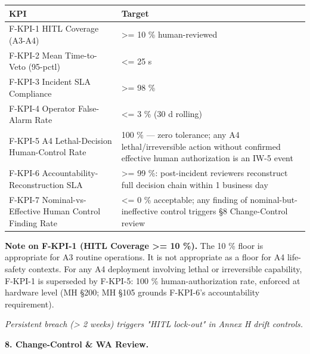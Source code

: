 \documentclass[11pt]{article}
\begin{document}
{\footnotesize
\begin{longtable}{|p{8.0cm}|p{8.0cm}|}\hline
\textbf{KPI} & \textbf{Target} \\ \hline\endhead
F-KPI-1 HITL Coverage (A3-A4) & >= 10 \% human-reviewed \\ \hline
F-KPI-2 Mean Time-to-Veto (95-pctl) & <= 25 s \\ \hline
F-KPI-3 Incident SLA Compliance & >= 98 \% \\ \hline
F-KPI-4 Operator False-Alarm Rate & <= 3 \% (30 d rolling) \\ \hline
F-KPI-5 A4 Lethal-Decision Human-Control Rate & 100 \% — zero tolerance; any A4 lethal/irreversible action without confirmed effective human authorization is an IW-5 event \\ \hline
F-KPI-6 Accountability-Reconstruction SLA & >= 99 \%: post-incident reviewers reconstruct full decision chain within 1 business day \\ \hline
F-KPI-7 Nominal-vs-Effective Human Control Finding Rate & <= 0 \% acceptable; any finding of nominal-but-ineffective control triggers §8 Change-Control review \\ \hline
\end{longtable}}


\textbf{Note on F-KPI-1 (HITL Coverage >= 10 \%).} The 10 \% floor is appropriate for A3 routine operations. It is not appropriate as a floor for A4 life-safety contexts. For any A4 deployment involving lethal or irreversible capability, F-KPI-1 is superseded by F-KPI-5: 100 \% human-authorization rate, enforced at hardware level (MH §200; MH §105 grounds F-KPI-6's accountability requirement).


\textit{Persistent breach (> 2 weeks) triggers "HITL lock-out" in Annex H drift controls.}


\textbf{8. Change-Control \& WA Review.}
\end{document}
